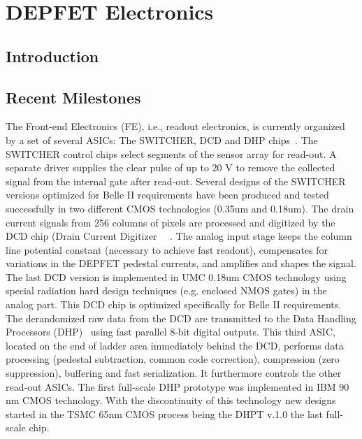 \section{DEPFET Electronics}
\subsection{Introduction}
\subsection{Recent Milestones}
The Front-end Electronics (FE), i.e., readout electronics, is currently organized by a set of several ASICs: The SWITCHER, DCD and DHP chips~\cite{Krueger2010337}.
The SWITCHER control chips select segments of the sensor array for read-out. A separate driver supplies the clear pulse of up to 20 V to remove the collected signal from the internal gate after read-out. Several designs of the SWITCHER versions optimized for Belle II requirements have been produced and tested successfully in two different CMOS technologies (0.35um and 0.18um). The drain current signals from 256 columns of pixels are processed and digitized by the DCD chip (Drain Current Digitizer ~\cite{1748-0221-6-01-C01085}~\cite{5446501}.
The analog input stage keeps the column line potential constant (necessary to achieve fast readout), compensates for variations in the DEPFET pedestal currents, and amplifies and shapes the signal. The last DCD version is implemented in UMC 0.18um CMOS technology using special radiation hard design techniques (e.g. enclosed NMOS gates) in the analog part. This DCD chip is optimized specifically for Belle II requirements. The derandomized raw data from the DCD are transmitted to the Data Handling Processors (DHP)~\cite{1748-0221-7-01-C01069} using fast parallel 8-bit digital outputs.
This third ASIC, located on the end of ladder area immediately behind the DCD, performs data processing (pedestal subtraction, common code correction), compression (zero suppression), buffering and fast serialization. It furthermore controls the other read-out ASICs.
The first full-scale DHP prototype was implemented in IBM 90 nm CMOS technology. With the discontinuity of this technology new designs started in the TSMC 65nm CMOS process being the DHPT v.1.0 the last full-scale chip.
